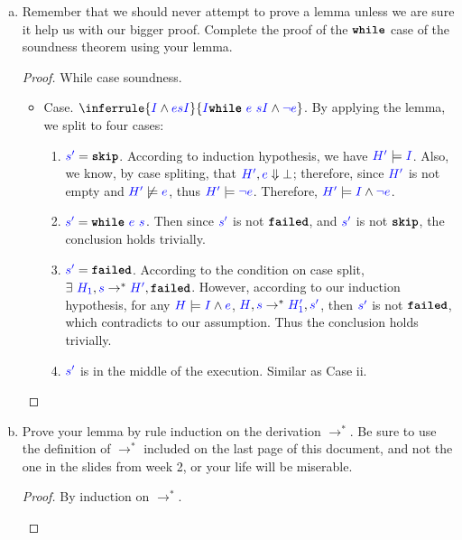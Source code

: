 \documentclass{article}
\theoremstyle{definition}
\newcommand{\meta}[1]{{\color{blue}#1}}
\newcommand{\progtext}[1]{\ensuremath{\text{\ttfamily\bfseries #1}}}
\newcommand{\impskip}{\progtext{skip}}
\newcommand{\failed}{\progtext{failed}}
\newcommand{\while}{\progtext{while}}
\begin{document}
\begin{enumerate}[start=1,label={{\bf Problem \arabic*}.},ref=\arabic*,left=0pt..0pt,widest*=10,align=left,itemindent=*]
\begin{enumerate}[(a),left=1em]
  \item Remember that we should never attempt to prove a lemma unless we are
    sure it help us with our bigger proof. Complete the proof of the $\while$
    case of the soundness theorem using your lemma.
    \begin{proof}
      While case soundness.
      \begin{itemize}
        \item Case. $\inferrule{
          \set{\meta{I}\wedge \meta{e}} \meta{s} \set{\meta{I}}
        }{\set{\meta{I}} \while\ \meta{e}\ \meta{s} \set{\meta{I} \wedge \meta{\neg e}}}$. By applying the lemma, we split to four cases:
        \begin{enumerate}
          \item $\meta{s^\prime}=\impskip$. According to induction hypothesis, we have $\meta{H^\prime}\models \meta{I}$. Also, we know, by case spliting, that $\meta{H^\prime}, \meta{e} \Downarrow \bot$; therefore, since $\meta{H^\prime}$ is not empty and $\meta{H^\prime} \not\models \meta{e}$, thus $\meta{H^\prime}\models\meta{\neg e}$. Therefore, $\meta{H^\prime} \models \set{\meta{I} \wedge \meta{\neg e}}$.
          \item $\meta{s^\prime}=\while\ \meta{e}\ \meta{s}$. Then since $\meta{s^\prime}$ is not $\failed$, and $\meta{s^\prime}$ is not $\impskip$, the conclusion holds trivially.
          \item $\meta{s^\prime}=\failed$. According to the condition on case split, $\exists\ \meta{H_1}, \meta{s} \to^* \meta{H^\prime}, \failed$. However, according to our induction hypothesis, for any $\meta{H} \models \set{\meta{I}\wedge \meta{e}}$, $\meta{H}, \meta{s} \to^* \meta{H_1^\prime}, \meta{s^\prime}$, then $\meta{s^\prime}$ is not $\failed$, which contradicts to our assumption. Thus the conclusion holds trivially.
          \item $\meta{s^\prime}$ is in the middle of the execution. Similar as Case ii.
        \end{enumerate}
      \end{itemize}
    \end{proof}
  \item Prove your lemma by rule induction on the derivation $\to^*$. Be sure to
    use the definition of $\to^*$ included on the last page of this document,
    and not the one in the slides from week 2, or your life will be miserable.
    \begin{proof}
      By induction on $\to^*$.
      \begin{itemize}

\end{itemize}
\end{proof}
\end{enumerate}
\end{enumerate}
\end{document}
